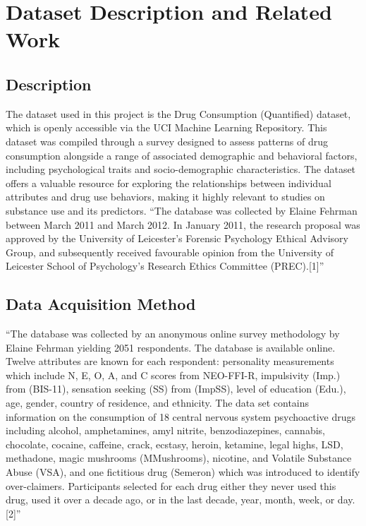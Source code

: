 \documentclass{article}
\begin{document}
\section{Dataset Description and Related Work}
\subsection{Description}

\hspace{1cm}The dataset used in this project is the Drug Consumption (Quantified) dataset, which is openly accessible via the UCI Machine Learning Repository. This dataset was compiled through a survey designed to assess patterns of drug consumption alongside a range of associated demographic and behavioral factors, including psychological traits and socio-demographic characteristics. The dataset offers a valuable resource for exploring the relationships between individual attributes and drug use behaviors, making it highly relevant to studies on substance use and its predictors. ``The database was collected by Elaine Fehrman between March 2011 and March 2012.
In January 2011, the research proposal was approved by the University of Leicester’s
Forensic Psychology Ethical Advisory Group, and subsequently received favourable
opinion from the University of Leicester School of Psychology’s Research Ethics
Committee (PREC).[1]''

\subsection{Data Acquisition Method}
\hspace{1cm}``The database was collected by an anonymous online survey
methodology by Elaine Fehrman yielding 2051 respondents. The database is available
online. Twelve attributes are known for each respondent: personality
measurements which include N, E, O, A, and C scores from NEO-FFI-R, impulsivity
(Imp.) from (BIS-11), sensation seeking (SS) from (ImpSS), level of education (Edu.),
age, gender, country of residence, and ethnicity. The data set contains information on
the consumption of 18 central nervous system psychoactive drugs including alcohol,
amphetamines, amyl nitrite, benzodiazepines, cannabis, chocolate, cocaine, caffeine,
crack, ecstasy, heroin, ketamine, legal highs, LSD, methadone, magic mushrooms
(MMushrooms), nicotine, and Volatile Substance Abuse (VSA), and one fictitious drug
(Semeron) which was introduced to identify over-claimers.
\newpage
Participants selected for
each drug either they never used this drug, used it over a decade ago, or in the last decade, year, month, week, or day.[2]''
\end{document}
